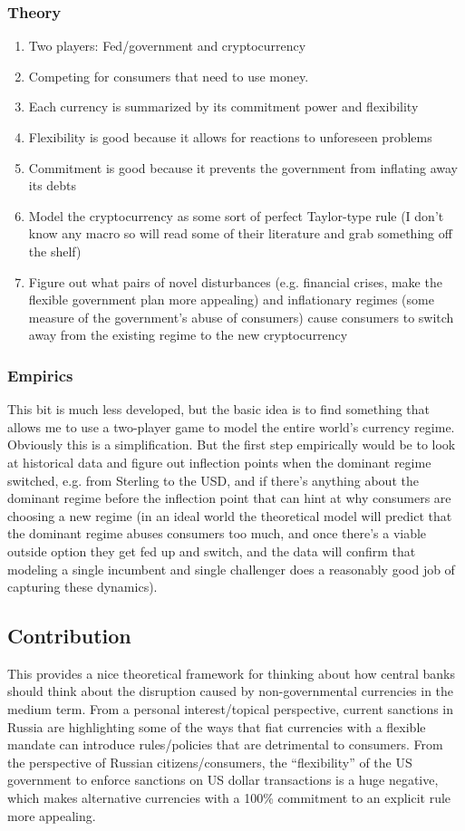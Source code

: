 \documentclass[dvipsnames]{article}
\begin{document}
\subsubsection{Theory}
\begin{enumerate}
\item  Two players: Fed/government and cryptocurrency
\item Competing for consumers that need to use money.
\item Each currency is summarized by its commitment power and flexibility
\item Flexibility is good because it allows for reactions to unforeseen problems
\item Commitment is good because it prevents the government from inflating away its debts
\item Model the cryptocurrency as some sort of perfect Taylor-type rule (I don't know any macro so will read some of their literature and grab something off the shelf)
  \item Figure out what pairs of novel disturbances (e.g. financial crises, make the flexible government plan more appealing) and inflationary regimes (some measure of the government's abuse of consumers) cause consumers to switch away from the existing regime to the new cryptocurrency
  \end{enumerate}
  \subsubsection{Empirics}
  This bit is much less developed, but the basic idea is to find something that allows me to use a two-player game to model the entire world's currency regime. Obviously this is a simplification. But the first step empirically would be to look at historical data and figure out inflection points when the dominant regime switched, e.g. from Sterling to the USD, and if there's anything about the dominant regime before the inflection point that can hint at why consumers are choosing a new regime (in an ideal world the theoretical model will predict that the dominant regime abuses consumers too much, and once there's a viable outside option they get fed up and switch, and the data will confirm that modeling a single incumbent and single challenger does a reasonably good job of capturing these dynamics).
  \subsection{Contribution}
  This provides a nice theoretical framework for thinking about how central banks should think about the disruption caused by non-governmental currencies in the medium term. From a personal interest/topical perspective, current sanctions in Russia are highlighting some of the ways that fiat currencies with a flexible mandate can introduce rules/policies that are detrimental to consumers. From the perspective of Russian citizens/consumers, the ``flexibility'' of the US government to enforce sanctions on US dollar transactions is a huge negative, which makes alternative currencies with a 100\% commitment to an explicit rule more appealing.
  \newpage
\end{document}
